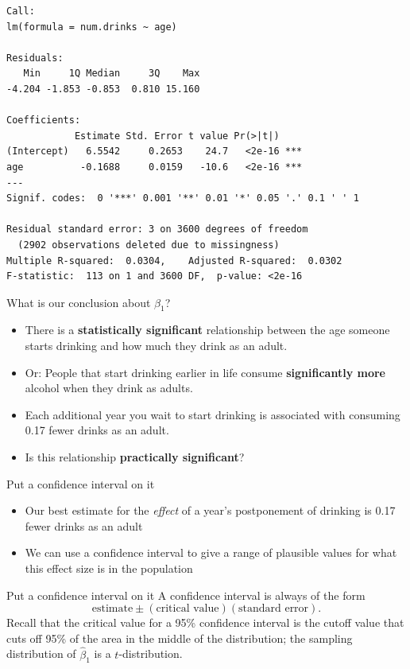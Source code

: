 \documentclass{beamer}\usepackage[]{graphicx}\usepackage[]{color}
\makeatletter
\newenvironment{kframe}{%
 \def\at@end@of@kframe{}%
 \ifinner\ifhmode%
  \def\at@end@of@kframe{\end{minipage}}%
  \begin{minipage}{\columnwidth}%
 \fi\fi%
 \def\FrameCommand##1{\hskip\@totalleftmargin \hskip-\fboxsep
 \colorbox{shadecolor}{##1}\hskip-\fboxsep
     \hskip-\linewidth \hskip-\@totalleftmargin \hskip\columnwidth}%
 \MakeFramed {\advance\hsize-\width
   \@totalleftmargin\z@ \linewidth\hsize
   \@setminipage}}%
 {\par\unskip\endMakeFramed%
 \at@end@of@kframe}
\newenvironment{knitrout}{}{} %
\makeatother
\begin{document}
\begin{darkframes}
\begin{frame}[fragile]
\begin{knitrout}
\begin{kframe}
\begin{verbatim}
Call:
lm(formula = num.drinks ~ age)

Residuals:
   Min     1Q Median     3Q    Max 
-4.204 -1.853 -0.853  0.810 15.160 

Coefficients:
            Estimate Std. Error t value Pr(>|t|)    
(Intercept)   6.5542     0.2653    24.7   <2e-16 ***
age          -0.1688     0.0159   -10.6   <2e-16 ***
---
Signif. codes:  0 '***' 0.001 '**' 0.01 '*' 0.05 '.' 0.1 ' ' 1

Residual standard error: 3 on 3600 degrees of freedom
  (2902 observations deleted due to missingness)
Multiple R-squared:  0.0304,	Adjusted R-squared:  0.0302 
F-statistic:  113 on 1 and 3600 DF,  p-value: <2e-16
\end{verbatim}
\end{kframe}
\end{knitrout}
    \end{frame}

    \begin{frame}{What is our conclusion about $\beta_1$?}
      \begin{itemize}[<+->]
        \item There is a \textbf{statistically significant} relationship between the age someone starts drinking and how much they drink as an adult.
        \item Or: People that start drinking earlier in life consume \textbf{significantly more} alcohol when they drink as adults.
        \item Each additional year you wait to start drinking is associated with consuming 0.17 fewer drinks as an adult.
        \item Is this relationship \textbf{practically significant}?
      \end{itemize}
    \end{frame}

    \begin{frame}{Put a confidence interval on it}
      \begin{itemize}[<+->]
        \item Our best estimate for the \emph{effect} of a year's postponement of drinking is 0.17 fewer drinks as an adult
        \item We can use a confidence interval to give a range of plausible values for what this effect size is in the population
      \end{itemize}
    \end{frame}

    \begin{frame}[fragile]{Put a confidence interval on it}
      A confidence interval is always of the form \[ \text{estimate} \pm (\text{critical value})(\text{standard error}). \]
      \pause
      Recall that the critical value for a 95\% confidence interval is the cutoff value that cuts off 95\% of the area in the middle of the distribution; the sampling distribution of $\hat\beta_1$ is a $t$-distribution.



\end{frame}
\end{darkframes}
\end{document}
